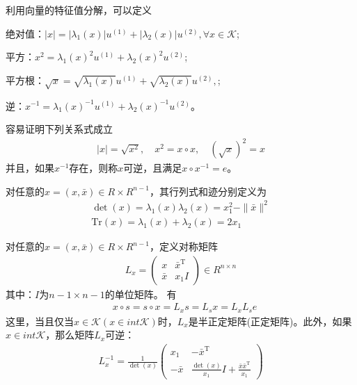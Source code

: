         利用向量的特征值分解，可以定义\par
        绝对值：$|x|=|{\lambda}_1(x)| u^{(1)}+|{\lambda}_2(x)| u^{(2)},\forall x \in \mathcal{K}$;\par
        平方：$x^2={\lambda}_1(x)^2 u^{(1)}+{\lambda}_2(x)^2 u^{(2)}$;\par
        平方根：$\sqrt{x}=\sqrt{{\lambda}_1(x)} u^{(1)}+\sqrt{{\lambda}_2(x)} u^{(2)},$;\par
        逆：$x^{-1}={\lambda}_1(x)^{-1} u^{(1)}+{\lambda}_2(x)^{-1} u^{(2)}$。
        \par
        容易证明下列关系式成立
        \begin{align*}
           |x|=\sqrt{x^2},\quad x^2=x \circ x,\quad (\sqrt{x})^2=x
        \end{align*}
        并且，如果$x^{-1}$存在，则称$x$可逆，且满足$x \circ x^{-1}=e$。
        \par
        对任意的$x=(x,\bar{x})\in R\times R^{n-1}$，其行列式和迹分别定义为
        \begin{align*}
           \det(x)={\lambda}_1(x){\lambda}_2(x)=x_1^2-\|\bar{x}\|^2\\
           \mathrm{Tr}(x)={\lambda}_1(x)+{\lambda}_2(x)=2x_1
        \end{align*}
        \par
        对任意的$x=(x,\bar{x})\in R\times R^{n-1}$，定义对称矩阵
        \begin{align*}
           L_x=\begin{pmatrix} x & \bar{x}^\mathrm{T} \\\bar{x} & x_1I\end{pmatrix}\in R^{n\times n}
        \end{align*}
        其中：$I$为${n-1}\times {n-1}$的单位矩阵。
        有
        \begin{align*}
          & x\circ s=s\circ x=L_xs=L_sx=L_xL_se
        \end{align*}
        这里，当且仅当$x \in \mathcal{K}(x \in int {} \mathcal{K})$时，$L_x$是半正定矩阵(正定矩阵)。此外，如果$x \in int{}\mathcal{K}$，那么矩阵$L_x$可逆：
        \begin{align*}
           L_x^{-1}=\frac {1}{\det(x)}\begin{pmatrix} x_1 & -\bar{x}^\mathrm{T} \\-\bar{x} & \frac{\det(x)}{x_1}I+\frac{\bar{x}{\bar{x}}^\mathrm{T} }{x_1}\end{pmatrix}
        \end{align*}
